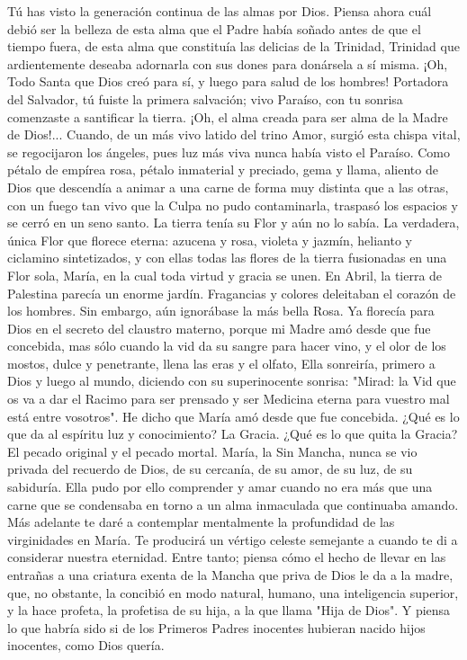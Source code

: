 \documentclass[12pt]{book} %
\begin{document}
Tú has visto la generación continua de las almas por Dios. Piensa ahora cuál debió ser la belleza de esta alma que el Padre había soñado antes de que el tiempo fuera, de esta alma que constituía las delicias de la Trinidad, Trinidad que ardientemente deseaba adornarla con sus dones para donársela a sí misma. ¡Oh, Todo Santa que Dios creó para sí, y luego para salud de los hombres! Portadora del Salvador, tú fuiste la primera salvación; vivo Paraíso, con tu sonrisa comenzaste a santificar la tierra. 
¡Oh, el alma creada para ser alma de la Madre de Dios!... Cuando, de un más vivo latido del trino Amor, surgió esta 
chispa vital, se regocijaron los ángeles, pues luz más viva nunca había visto el Paraíso. Como pétalo de empírea rosa, pétalo inmaterial y preciado, gema y llama, aliento de Dios que descendía a animar a una carne de forma muy distinta que a las otras, con un fuego tan vivo que la Culpa no pudo contaminarla, traspasó los espacios y se cerró en un seno santo. 
La tierra tenía su Flor y aún no lo sabía. La verdadera, única Flor que florece eterna: azucena y rosa, violeta y jazmín, 
helianto y ciclamino sintetizados, y con ellas todas las flores de la tierra fusionadas en una Flor sola, María, en la cual toda virtud y gracia se unen. 
En Abril, la tierra de Palestina parecía un enorme jardín. Fragancias y colores deleitaban el corazón de los hombres. Sin embargo, aún ignorábase la más bella Rosa. Ya florecía para Dios en el secreto del claustro materno, porque mi Madre amó desde que fue concebida, mas sólo cuando la vid da su sangre para hacer vino, y el olor de los mostos, dulce y penetrante, llena las eras y el olfato, Ella sonreiría, primero a Dios y luego al mundo, diciendo con su superinocente sonrisa: "Mirad: la Vid que os va a dar el Racimo para ser prensado y ser Medicina eterna para vuestro mal está entre vosotros". 
He dicho que María amó desde que fue concebida. ¿Qué es lo que da al espíritu luz y conocimiento? La Gracia. ¿Qué es 
lo que quita la Gracia? El pecado original y el pecado mortal. María, la Sin Mancha, nunca se vio privada del recuerdo de Dios, de su cercanía, de su amor, de su luz, de su sabiduría. Ella pudo por ello comprender y amar cuando no era más que una carne que se condensaba en torno a un alma inmaculada que continuaba amando. 
Más adelante te daré a contemplar mentalmente la profundidad de las virginidades en María. Te producirá un vértigo 
celeste semejante a cuando te di a considerar nuestra eternidad. Entre tanto; piensa cómo el hecho de llevar en las entrañas a una criatura exenta de la Mancha que priva de Dios le da a la madre, que, no obstante, la concibió en modo natural, humano, una inteligencia superior, y la hace profeta, la profetisa de su hija, a la que llama "Hija de Dios". Y piensa lo que habría sido si de los Primeros Padres inocentes hubieran nacido hijos inocentes, como Dios quería. 
\end{document}
